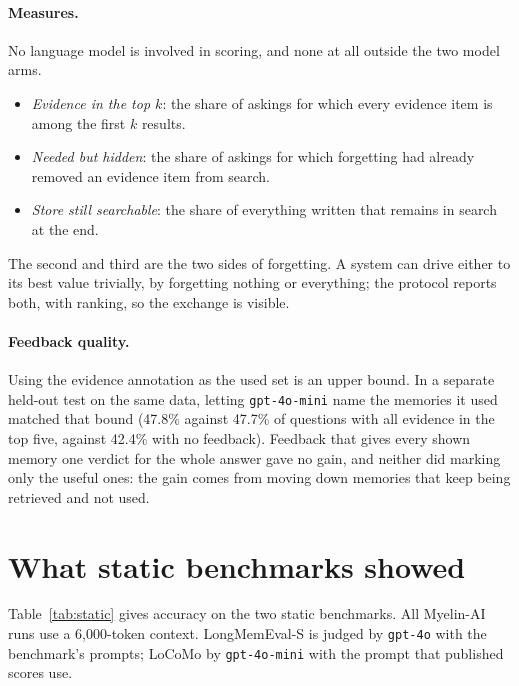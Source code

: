 \documentclass[11pt]{article}
\begin{document}
\paragraph{Measures.} No language model is involved in scoring, and
none at all outside the two model arms.
\begin{itemize}
\item \emph{Evidence in the top $k$}: the share of askings for which
  every evidence item is among the first $k$ results.
\item \emph{Needed but hidden}: the share of askings for which
  forgetting had already removed an evidence item from search.
\item \emph{Store still searchable}: the share of everything written
  that remains in search at the end.
\end{itemize}
The second and third are the two sides of forgetting. A system can
drive either to its best value trivially, by forgetting nothing or
everything; the protocol reports both, with ranking, so the exchange
is visible.

\paragraph{Feedback quality.} Using the evidence annotation as the
used set is an upper bound. In a separate held-out test on the same
data, letting \texttt{gpt-4o-mini} name the memories it used matched
that bound (47.8\% against 47.7\% of questions with all evidence in
the top five, against 42.4\% with no feedback). Feedback that gives
every shown memory one verdict for the whole answer gave no gain, and
neither did marking only the useful ones: the gain comes from moving
down memories that keep being retrieved and not used.

\section{What static benchmarks showed}
\label{sec:static}

Table~\ref{tab:static} gives accuracy on the two static benchmarks.
All \mbox{Myelin-AI} runs use a 6{,}000-token context. LongMemEval-S is judged
by \texttt{gpt-4o} with the benchmark's prompts; LoCoMo by
\texttt{gpt-4o-mini} with the prompt that published scores use.
\end{document}
